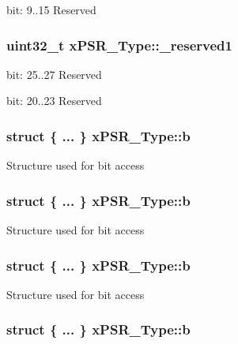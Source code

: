 bit\-: 9..15 Reserved \hypertarget{unionx_p_s_r___type_a790056bb6f20ea16cecc784b0dd19ad6}{
\subsubsection[{\-\_\-reserved1}]{\setlength{\rightskip}{0pt plus 5cm}uint32\-\_\-t x\-P\-S\-R\-\_\-\-Type\-::\-\_\-reserved1}}\label{unionx_p_s_r___type_a790056bb6f20ea16cecc784b0dd19ad6}
bit\-: 25..27 Reserved

bit\-: 20..23 Reserved \hypertarget{unionx_p_s_r___type_a3b1063bb5cdad67e037cba993b693b70}{
\subsubsection[{b}]{\setlength{\rightskip}{0pt plus 5cm}struct \{ ... \}   x\-P\-S\-R\-\_\-\-Type\-::b}}\label{unionx_p_s_r___type_a3b1063bb5cdad67e037cba993b693b70}
Structure used for bit access \hypertarget{unionx_p_s_r___type_aac24d2492d64a2f18dce38ad3d5bc6b9}{
\subsubsection[{b}]{\setlength{\rightskip}{0pt plus 5cm}struct \{ ... \}   x\-P\-S\-R\-\_\-\-Type\-::b}}\label{unionx_p_s_r___type_aac24d2492d64a2f18dce38ad3d5bc6b9}
Structure used for bit access \hypertarget{unionx_p_s_r___type_a477983eb9f0417d63288ddf538d7060b}{
\subsubsection[{b}]{\setlength{\rightskip}{0pt plus 5cm}struct \{ ... \}   x\-P\-S\-R\-\_\-\-Type\-::b}}\label{unionx_p_s_r___type_a477983eb9f0417d63288ddf538d7060b}
Structure used for bit access \hypertarget{unionx_p_s_r___type_aadeab5e1061c379c66bd3e4c97c1c413}{
\subsubsection[{b}]{\setlength{\rightskip}{0pt plus 5cm}struct \{ ... \}   x\-P\-S\-R\-\_\-\-Type\-::b}}\label{unionx_p_s_r___type_aadeab5e1061c379c66bd3e4c97c1c413}
